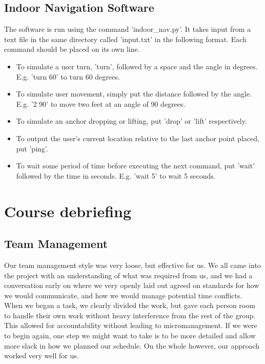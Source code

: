 \documentclass[letterpaper,12pt]{article}
\begin{document}
\subsection{Indoor Navigation Software}
The software is run using the command 'indoor\_nav.py'. It takes input from a text file in the same directory called 'input.txt' in the following format. Each command should be placed on its own line.
\begin{itemize}
    \item To simulate a user turn, 'turn', followed by a space and the angle in degrees. E.g. 'turn 60' to turn 60 degrees.
    \item To simulate user movement, simply put the distance followed by the angle. E.g. '2 90' to move two feet at an angle of 90 degrees.
    \item To simulate an anchor dropping or lifting, put 'drop' or 'lift' respectively.
    \item To output the user's current location relative to the last anchor point placed, put 'ping'.
    \item To wait some period of time before executing the next command, put 'wait' followed by the time in seconds. E.g. 'wait 5' to wait 5 seconds.
\end{itemize}

\newpage

\section{Course debriefing}

\subsection{Team Management}
Our team management style was very loose, but effective for us. We all came into the project with an understanding of what was required from us, and we had a conversation early on where we very openly laid out agreed on standards for how we would communicate, and how we would manage potential time conflicts. When we began a task, we clearly divided the work, but gave each person room to handle their own work without heavy interference from the rest of the group. This allowed for accountability without leading to micromanagement. If we were to begin again, one step we might want to take is to be more detailed and allow more slack in how we planned our schedule. On the whole however, our approach worked very well for us.
\end{document}
